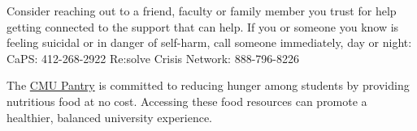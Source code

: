 \documentclass[11pt, a4paper]{article}
\begin{document}
Consider reaching out to a friend, faculty or family member you trust for help
getting connected to the support that can help. If you or someone you know is
feeling suicidal or in danger of self-harm, call someone immediately, day or
night: CaPS: 412-268-2922 Re:solve Crisis Network: 888-796-8226

The \href{https://www.cmu.edu/student-affairs/resources/cmu-pantry/}{CMU Pantry}
is committed to reducing hunger among students by providing nutritious food at
no cost. Accessing these food resources can promote a healthier, balanced
university experience.

\clearpage
\end{document}
